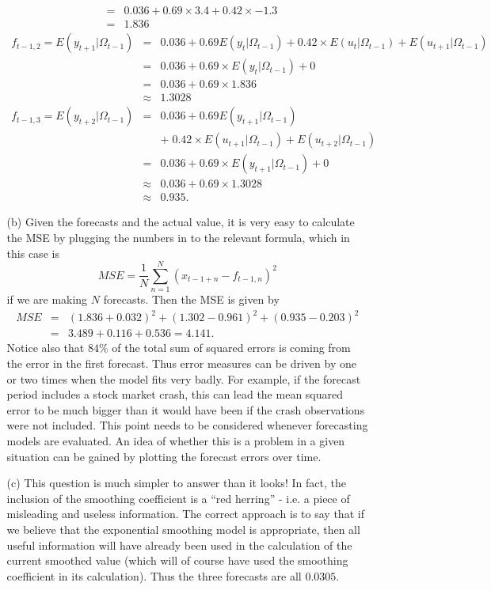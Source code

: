 \documentclass[11pt,a4paper]{article}
\begin{document}
\begin{itemize}
\begin{itemize}
$$\begin{array}{rcl}
 & = & 0.036 +0.69 \times 3.4 + 0.42\times -1.3 \\
& = & 1.836
\end{array}
$$
$$
\begin{array}{rcl}
 f_{t-1,2} = E(y_{t+1}|\Omega_{t-1}) & = & 0.036 +0.69 E(y_{t}|\Omega_{t-1}) + 0.42\times E(u_{t}| \Omega_{t-1}) + E(u_{t+1}| \Omega_{t-1}) \\
 & = & 0.036 +0.69 \times E(y_{t}|\Omega_{t-1}) + 0 \\
 & = & 0.036 +0.69 \times 1.836  \\
&\approx & 1.3028
\end{array}
$$
$$
\begin{array}{rcl}
 f_{t-1,3} = E(y_{t+2}|\Omega_{t-1}) & = & 0.036 +0.69 E(y_{t+1}|\Omega_{t-1})\\ && +\; 0.42\times E(u_{t+1}| \Omega_{t-1}) + E(u_{t+2}| \Omega_{t-1}) \\
 & = & 0.036 +0.69 \times E(y_{t+1}|\Omega_{t-1}) + 0 \\
 & \approx & 0.036 +0.69 \times 1.3028  \\
& \approx & 0.935.
\end{array}
$$
\item[(b)] Given the forecasts and the actual value, it is very easy to
calculate the MSE by plugging the numbers in to the relevant formula, which in
this case is
$$
MSE =
\frac{1}{N} \sum_{n=1}^N \left( x_{t -1+ n} - f_{t -1, n} \right)^2
$$
if we are making $N$ forecasts. Then the MSE is given by
$$
\begin{array}{rcl}
MSE &  =  & (1.836 + 0.032)^2 + (1.302 - 0.961)^2 + (0.935 - 0.203)^2  \\
& = & 3.489 + 0.116 + 0.536 =  4.141.
\end{array}
$$
Notice also that $84\%$ of the total sum of squared errors is coming from the error
in the first forecast. Thus error measures can be driven by one or two times
when the model fits very badly. For example, if the forecast period includes
a stock market crash, this can lead the mean squared error to be much
bigger than it would have been if the crash observations were not included.
This point needs to be considered whenever forecasting models are evaluated.
An idea of whether this is a problem in a given situation can be gained by
plotting the forecast errors over time.
\item[(c)] This question is much simpler to answer than it looks! In fact, the
 inclusion of the smoothing coefficient is a ``red herring'' - i.e. a piece of
misleading and useless information. The correct approach is to say that if we
believe that the exponential smoothing model is appropriate, then all useful
information will have already been used in the calculation of the current
smoothed value (which will of course have used the smoothing coefficient in
its calculation). Thus the three forecasts are all $0.0305$.


\end{itemize}
\end{itemize}
\end{document}
